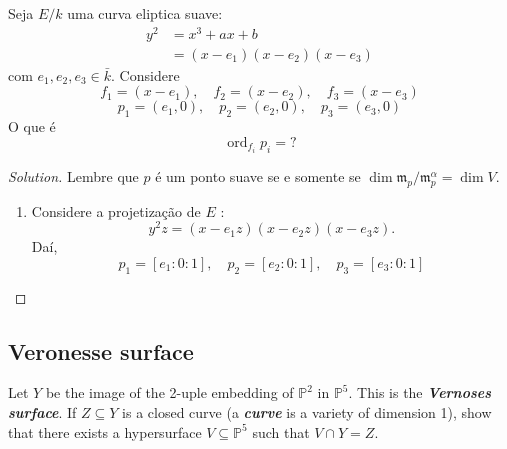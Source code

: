 \begin{exercise}
	Seja $E/k$ uma curva eliptica suave:
	\begin{align*}
		y^2&=x^3+ax+b\\
		&=(x-e_1)(x-e_2)(x-e_3)
	\end{align*}
	com $e_1,e_2,e_3\in\bar{k}$. Considere
	\[f_1=(x-e_1),\quad f_2=(x-e_2),\quad f_3=(x-e_3)\]
	\[p_1=(e_1,0),\quad p_2=(e_2,0),\quad p_3=(e_3,0)\]
	O que \'e
	\[\operatorname{ord}_{f_i}p_i=?\]
\end{exercise}

\begin{proof}[Solution] Lembre que $p$ \'e um ponto suave se e somente se $\dim \mathfrak{m}_p/\mathfrak{m}_p^\alpha=\dim V$.
	\begin{enumerate}[label=\textbf{Step \arabic*}]
		\item Considere a projetiza\c c\~ao de $E$ :
			\[y^2z=(x-e_1z)(x-e_2z)(x-e_3z).\]
			Da\'i,
			\[p_1=[e_1:0:1],\quad p_2=[e_2:0:1],\quad p_3=[e_3:0:1]\]
			
	\end{enumerate}
\end{proof}

\subsection{Veronesse surface}

\begin{manualexercise}{2.13}
	Let $Y$ be the image of the 2-uple embedding of $\mathbb{P}^2$ in $\mathbb{P}^{5}$. This is the \textit{\textbf{Vernoses surface}}. If $Z\subseteq Y$ is a closed curve (a \textit{\textbf{curve}} is a variety of dimension 1), show that there exists a hypersurface $V\subseteq \mathbb{P}^5$ such that $V \cap Y=Z$.
\end{manualexercise}

